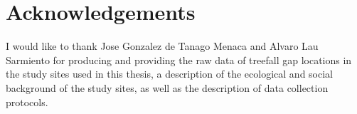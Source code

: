 \documentclass[a4paper,12pt]{scrbook}
\begin{document}
\chapter*{Acknowledgements}

I would like to thank Jose Gonzalez de Tanago Menaca and Alvaro Lau Sarmiento for producing and providing the raw data of treefall gap locations in the study sites used in this thesis, a description of the ecological and social background of the study sites, as well as the description of data collection protocols.

\printglossary[type=acronym]


\end{document}
